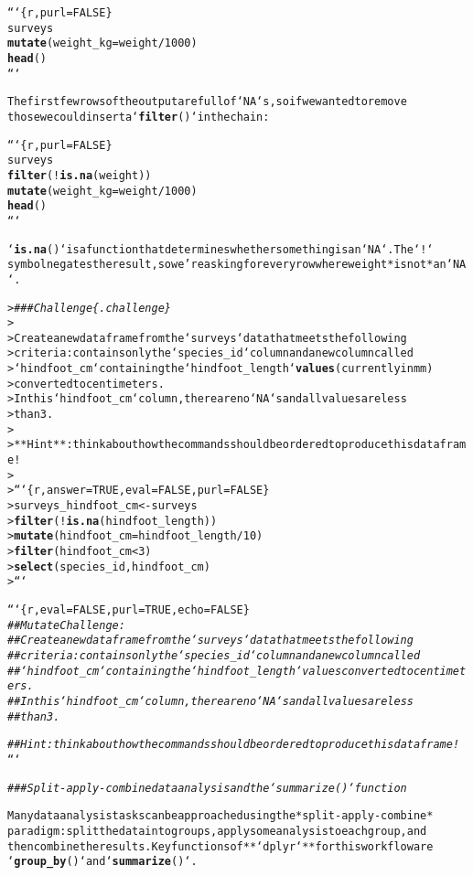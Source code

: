 \documentclass{article}\usepackage[]{graphicx}\usepackage[]{xcolor}
\makeatletter
\newcommand{\hlcom}[1]{\textcolor[rgb]{0.678,0.584,0.686}{\textit{#1}}}%
\newcommand{\hlkwd}[1]{\textcolor[rgb]{0.737,0.353,0.396}{\textbf{#1}}}%
\newenvironment{kframe}{%
 \def\at@end@of@kframe{}%
 \ifinner\ifhmode%
  \def\at@end@of@kframe{\end{minipage}}%
  \begin{minipage}{\columnwidth}%
 \fi\fi%
 \def\FrameCommand##1{\hskip\@totalleftmargin \hskip-\fboxsep
 \colorbox{shadecolor}{##1}\hskip-\fboxsep
     \hskip-\linewidth \hskip-\@totalleftmargin \hskip\columnwidth}%
 \MakeFramed {\advance\hsize-\width
   \@totalleftmargin\z@ \linewidth\hsize
   \@setminipage}}%
 {\par\unskip\endMakeFramed%
 \at@end@of@kframe}
\newenvironment{knitrout}{}{} %
\makeatother
\begin{document}
\begin{knitrout}
\begin{kframe}
\begin{alltt}
```\{r, purl = FALSE\}
surveys %>%
  \hlkwd{mutate}(weight_kg = weight / 1000) %>%
  \hlkwd{head}()
```

The first few rows of the output are full of `NA`s, so if we wanted to remove
those we could insert a `\hlkwd{filter}()` in the chain:

```\{r, purl = FALSE\}
surveys %>%
  \hlkwd{filter}(!\hlkwd{is.na}(weight)) %>%
  \hlkwd{mutate}(weight_kg = weight / 1000) %>%
  \hlkwd{head}()
```

`\hlkwd{is.na}()` is a function that determines whether something is an `NA`. The `!`
symbol negates the result, so we're asking for every row where weight *is not* an `NA`.

> \hlcom{### Challenge \{.challenge\}}
>
>  Create a new data frame from the `surveys` data that meets the following
>  criteria: contains only the `species_id` column and a new column called
>  `hindfoot_cm` containing the `hindfoot_length` \hlkwd{values} (currently in mm)
>  converted to centimeters.
>  In this `hindfoot_cm` column, there are no `NA`s and all values are less
>  than 3.
>
>  **Hint**: think about how the commands should be ordered to produce this data frame!
>
> ```\{r, answer=TRUE, eval=FALSE, purl=FALSE\}
> surveys_hindfoot_cm <- surveys %>%
>     \hlkwd{filter}(!\hlkwd{is.na}(hindfoot_length)) %>%
>     \hlkwd{mutate}(hindfoot_cm = hindfoot_length / 10) %>%
>     \hlkwd{filter}(hindfoot_cm < 3) %>%
>     \hlkwd{select}(species_id, hindfoot_cm)
> ```


```\{r, eval=FALSE, purl=TRUE, echo=FALSE\}
\hlcom{## Mutate Challenge:}
\hlcom{##  Create a new data frame from the `surveys` data that meets the following}
\hlcom{##  criteria: contains only the `species_id` column and a new column called}
\hlcom{##  `hindfoot_cm` containing the `hindfoot_length` values converted to centimeters.}
\hlcom{##  In this `hindfoot_cm` column, there are no `NA`s and all values are less}
\hlcom{##  than 3.}

\hlcom{##  Hint: think about how the commands should be ordered to produce this data frame!}
```

\hlcom{### Split-apply-combine data analysis and the `summarize()` function}

Many data analysis tasks can be approached using the *split-apply-combine*
paradigm: split the data into groups, apply some analysis to each group, and
then combine the results. Key functions of **`dplyr`** for this workflow are
`\hlkwd{group_by}()` and `\hlkwd{summarize}()`.



\end{alltt}
\end{kframe}
\end{knitrout}
\end{document}
